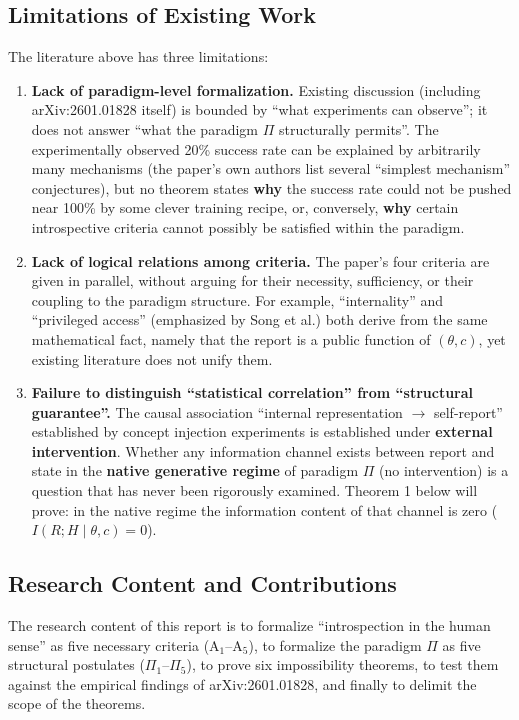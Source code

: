 \subsection{Limitations of Existing Work}

The literature above has three limitations:

\begin{enumerate}
\item \textbf{Lack of paradigm-level formalization.} Existing discussion (including
arXiv:2601.01828 itself) is bounded by ``what experiments can observe''; it does not answer
``what the paradigm $\Pi$ structurally permits''. The experimentally observed 20\% success rate
can be explained by arbitrarily many mechanisms (the paper's own authors list several
``simplest mechanism'' conjectures\cite{lindsey-2026-introspection}), but no theorem states
\textbf{why} the success rate could not be pushed near 100\% by some clever training recipe,
or, conversely, \textbf{why} certain introspective criteria cannot possibly be satisfied within
the paradigm.
\item \textbf{Lack of logical relations among criteria.} The paper's four criteria are given
in parallel, without arguing for their necessity, sufficiency, or their coupling to the
paradigm structure. For example, ``internality'' and ``privileged access'' (emphasized by Song et
al.\cite{song-privileged-2025}) both derive from the same mathematical fact, namely that the report is a
public function of $(\theta,c)$, yet existing literature does not unify them.
\item \textbf{Failure to distinguish ``statistical correlation'' from ``structural guarantee''.}
The causal association ``internal representation $\to$ self-report'' established by concept
injection experiments is established under \textbf{external intervention}. Whether any
information channel exists between report and state in the \textbf{native generative regime}
of paradigm $\Pi$ (no intervention) is a question that has never been rigorously examined.
Theorem 1 below will prove: in the native regime the information content of that
channel is zero ($I(R;H\mid\theta,c)=0$).
\end{enumerate}

\subsection{Research Content and Contributions}

The research content of this report is to formalize ``introspection in the human sense'' as
five necessary criteria ($\mathrm{A}_1$--$\mathrm{A}_5$), to formalize the paradigm $\Pi$ as
five structural postulates ($\Pi_1$--$\Pi_5$), to prove six impossibility theorems, to test
them against the empirical findings of arXiv:2601.01828, and finally to delimit the scope of
the theorems.

